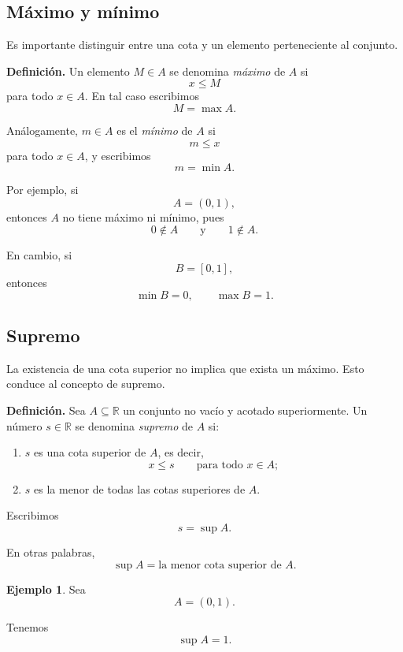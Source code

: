 \documentclass[12pt]{article}
\theoremstyle{plain}
\theoremstyle{definition}
\newtheorem{Ejem}[Teo]{Ejemplo}
\theoremstyle{remark}
\begin{document}
{%
\subsection*{Máximo y mínimo}

Es importante distinguir entre una cota y un elemento perteneciente al conjunto.

\textbf{Definición.}
Un elemento $M\in A$ se denomina \emph{máximo} de $A$ si
\[
x\leq M
\]
para todo $x\in A$. En tal caso escribimos
\[
M=\max A.
\]

Análogamente, $m\in A$ es el \emph{mínimo} de $A$ si
\[
m\leq x
\]
para todo $x\in A$, y escribimos
\[
m=\min A.
\]

Por ejemplo, si
\[
A=(0,1),
\]
entonces $A$ no tiene máximo ni mínimo, pues
\[
0\notin A
\qquad\text{y}\qquad
1\notin A.
\]

En cambio, si
\[
B=[0,1],
\]
entonces
\[
\min B=0,
\qquad
\max B=1.
\]

\subsection*{Supremo}

La existencia de una cota superior no implica que exista un máximo. Esto conduce al concepto de supremo.

\textbf{Definición.}
Sea $A\subseteq\mathbb{R}$ un conjunto no vacío y acotado superiormente. Un número $s\in\mathbb{R}$ se denomina \emph{supremo} de $A$ si:

\begin{enumerate}
    \item $s$ es una cota superior de $A$, es decir,
    \[
    x\leq s
    \qquad\text{para todo }x\in A;
    \]

    \item $s$ es la menor de todas las cotas superiores de $A$.
\end{enumerate}

Escribimos
\[
s=\sup A.
\]

En otras palabras,
\[
\boxed{
\sup A=\text{la menor cota superior de }A.
}
\]

\begin{Ejem}
Sea
\[
A=(0,1).
\]

Tenemos
\[
\sup A=1.
\]


\end{Ejem}}
\end{document}
